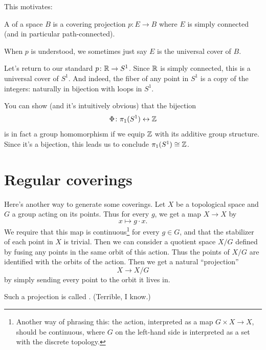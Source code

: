 This motivates:
\begin{definition}
	A  of a space $B$ is a covering projection
	$p \colon E \to B$ where $E$ is simply connected (and in particular path-connected).
\end{definition}
\begin{abuse}
	When $p$ is understood, we sometimes just say $E$ is the universal cover of $B$.
\end{abuse}

\begin{example}
	Let's return to our standard $p \colon \mathbb R \to S^1$.
	Since $\mathbb R$ is simply connected, this is a universal cover of $S^1$.
	And indeed, the fiber of any point in $S^1$
	is a copy of the integers: naturally in bijection with loops in $S^1$.

	You can show (and it's intuitively obvious) that the bijection
	\[ \Phi \colon \pi_1(S^1) \leftrightarrow \mathbb Z \]
	is in fact a group homomorphism if we equip $\mathbb Z$ with its
	additive group structure.
	Since it's a bijection, this leads us to conclude $\pi_1(S^1) \cong \mathbb Z$.
\end{example}

\section{Regular coverings}

Here's another way to generate some coverings.
Let $X$ be a topological space and $G$ a group acting on its points.
Thus for every $g$, we get a map $X \to X$ by
\[ x \mapsto g \cdot x. \]
We require that this map is continuous\footnote{%
	Another way of phrasing this: the action,
	interpreted as a map $G \times X \to X$, should be continuous,
	where $G$ on the left-hand side is interpreted as a set with
	the discrete topology.}
for every $g \in G$, and that the stabilizer of each point in $X$ is trivial.
Then we can consider a quotient space $X/G$ defined by fusing any points
in the same orbit of this action.
Thus the points of $X/G$ are identified with the orbits of the action.
Then we get a natural ``projection''
\[ X \to X/G \]
by simply sending every point to the orbit it lives in.
\begin{definition}
	Such a projection is called .
	(Terrible, I know.)
\end{definition}

